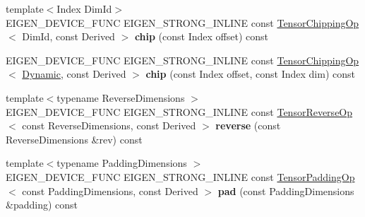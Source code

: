\begin{DoxyCompactItemize}
\mbox{\label{class_eigen_1_1_tensor_base_3_01_derived_00_01_read_only_accessors_01_4_a0bd0cb42db9a606f1d95ec7038e673a0}} 
{\footnotesize template$<$Index Dim\+Id$>$ }\\E\+I\+G\+E\+N\+\_\+\+D\+E\+V\+I\+C\+E\+\_\+\+F\+U\+NC E\+I\+G\+E\+N\+\_\+\+S\+T\+R\+O\+N\+G\+\_\+\+I\+N\+L\+I\+NE const \hyperlink{class_eigen_1_1_tensor_chipping_op}{Tensor\+Chipping\+Op}$<$ Dim\+Id, const Derived $>$ {\bfseries chip} (const Index offset) const
\item 
\mbox{\label{class_eigen_1_1_tensor_base_3_01_derived_00_01_read_only_accessors_01_4_ad63247509de699335f58edcab31d8536}} 
E\+I\+G\+E\+N\+\_\+\+D\+E\+V\+I\+C\+E\+\_\+\+F\+U\+NC E\+I\+G\+E\+N\+\_\+\+S\+T\+R\+O\+N\+G\+\_\+\+I\+N\+L\+I\+NE const \hyperlink{class_eigen_1_1_tensor_chipping_op}{Tensor\+Chipping\+Op}$<$ \hyperlink{namespace_eigen_ad81fa7195215a0ce30017dfac309f0b2}{Dynamic}, const Derived $>$ {\bfseries chip} (const Index offset, const Index dim) const
\item 
\mbox{\label{class_eigen_1_1_tensor_base_3_01_derived_00_01_read_only_accessors_01_4_a92bab964b4fc16bdaadee34cf0bb1c8b}} 
{\footnotesize template$<$typename Reverse\+Dimensions $>$ }\\E\+I\+G\+E\+N\+\_\+\+D\+E\+V\+I\+C\+E\+\_\+\+F\+U\+NC E\+I\+G\+E\+N\+\_\+\+S\+T\+R\+O\+N\+G\+\_\+\+I\+N\+L\+I\+NE const \hyperlink{class_eigen_1_1_tensor_reverse_op}{Tensor\+Reverse\+Op}$<$ const Reverse\+Dimensions, const Derived $>$ {\bfseries reverse} (const Reverse\+Dimensions \&rev) const
\item 
\mbox{\label{class_eigen_1_1_tensor_base_3_01_derived_00_01_read_only_accessors_01_4_a924065692761bde14e0d6a11a427bae2}} 
{\footnotesize template$<$typename Padding\+Dimensions $>$ }\\E\+I\+G\+E\+N\+\_\+\+D\+E\+V\+I\+C\+E\+\_\+\+F\+U\+NC E\+I\+G\+E\+N\+\_\+\+S\+T\+R\+O\+N\+G\+\_\+\+I\+N\+L\+I\+NE const \hyperlink{class_eigen_1_1_tensor_padding_op}{Tensor\+Padding\+Op}$<$ const Padding\+Dimensions, const Derived $>$ {\bfseries pad} (const Padding\+Dimensions \&padding) const
\item 

\end{DoxyCompactItemize}
